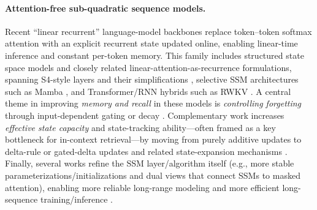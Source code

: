 
\paragraph{Attention-free sub-quadratic sequence models.}
Recent ``linear recurrent'' language-model backbones replace token--token
softmax attention with an explicit recurrent state updated online, enabling
linear-time inference and constant per-token memory.
This family includes structured state space models and closely related
linear-attention-as-recurrence formulations, spanning S4-style layers and their
simplifications \cite{gu2021s4,smith2022s5,gupta2022dss,gu2022s4dparam},
selective SSM architectures such as Mamba \cite{gu2023mamba},
and Transformer/RNN hybrids such as RWKV \cite{peng2023rwkv}.
A central theme in improving \emph{memory and recall} in these models is
\emph{controlling forgetting} through input-dependent gating or decay
\cite{gu2023mamba,peng2023rwkv,peng2025rwkv7,yang2023gla}.
Complementary work increases \emph{effective state capacity} and state-tracking
ability---often framed as a key bottleneck for in-context retrieval---by moving
from purely additive updates to delta-rule or gated-delta updates and related
state-expansion mechanisms \cite{yang2024deltanet,yang2024gateddeltanet,siems2025deltaproduct,grazzi2024statetracking}.
Finally, several works refine the SSM layer/algorithm itself (e.g., more stable
parameterizations/initializations and dual views that connect SSMs to masked
attention), enabling more reliable long-range modeling and more efficient
long-sequence training/inference \cite{gu2022s4dparam,smith2022s5,dao2024ssmduality,fu2022h3}.


